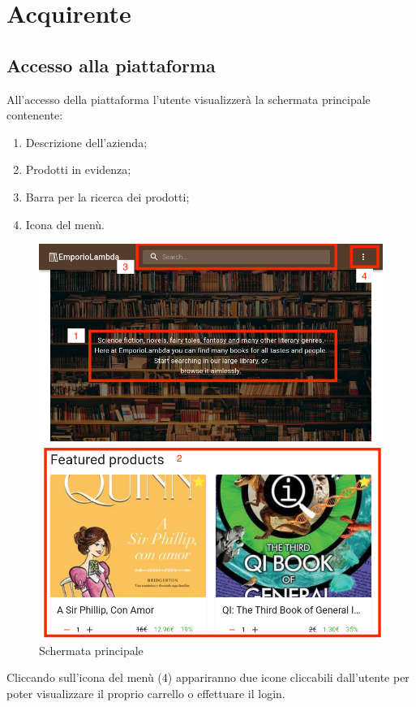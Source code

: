 \section{Acquirente}\label{Acquirente}
\subsection{Accesso alla piattaforma}
All'accesso della piattaforma l'utente visualizzerà la schermata principale contenente:
\begin{enumerate}
	\item Descrizione dell'azienda;
	\item Prodotti in evidenza;
	\item Barra per la ricerca dei prodotti;
	\item Icona del menù. 
\end{enumerate} 
\begin{figure}[H]
	\centering
	\includegraphics[scale=0.4]{Immagini/Acquirente/home_primo_accesso.png}
	\caption{Schermata principale}
	\label{fig:Home}
\end{figure}
Cliccando sull'icona del menù (4) appariranno due icone cliccabili dall'utente per poter visualizzare il proprio carrello o effettuare il login.
